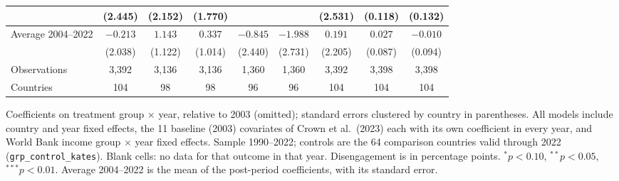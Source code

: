 \begin{table}[htbp]
{\begin{tabular}{lcccccccc}
 & (2.445) & (2.152) & (1.770) &  &  & (2.531) & (0.118) & (0.132) \\
\midrule
Average 2004--2022 & $-0.213$ & $1.143$ & $0.337$ & $-0.845$ & $-1.988$ & $0.191$ & $0.027$ & $-0.010$ \\
 & (2.038) & (1.122) & (1.014) & (2.440) & (2.731) & (2.205) & (0.087) & (0.094) \\
Observations & 3,392 & 3,136 & 3,136 & 1,360 & 1,360 & 3,392 & 3,398 & 3,398 \\
Countries & 104 & 98 & 98 & 96 & 96 & 104 & 104 & 104 \\
\bottomrule
\end{tabular}}
\par\vspace{4pt}
\begin{minipage}{\textwidth}\footnotesize Coefficients on treatment group $\times$ year, relative to 2003 (omitted); standard errors clustered by country in parentheses. All models include country and year fixed effects, the 11 baseline (2003) covariates of Crown et al.\ (2023) each with its own coefficient in every year, and World Bank income group $\times$ year fixed effects. Sample 1990--2022; controls are the 64 comparison countries valid through 2022 (\texttt{grp\_control\_kates}). Blank cells: no data for that outcome in that year. Disengagement is in percentage points. $^{*}p<0.10$, $^{**}p<0.05$, $^{***}p<0.01$. Average 2004--2022 is the mean of the post-period coefficients, with its standard error.\end{minipage}
\end{table}
